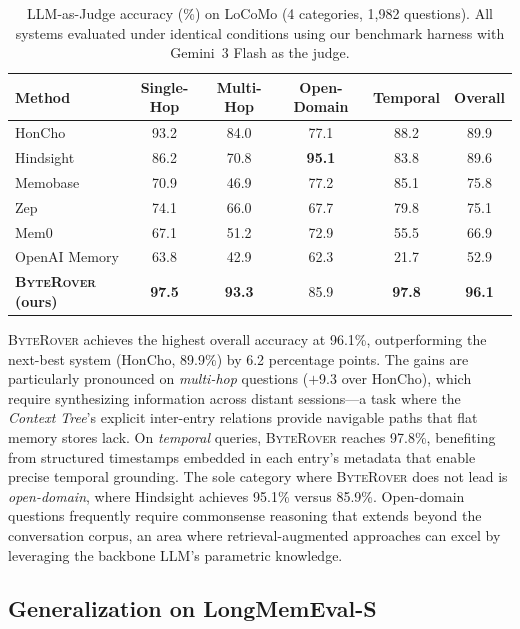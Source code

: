 \documentclass[11pt]{article}
\newcommand{\byterover}{\textsc{ByteRover}}
\newcommand{\contexttree}{\textit{Context Tree}}
\begin{document}
\begin{table}[t]
\centering
\small
\begin{tabular}{@{}lcccc|c@{}}
\toprule
\textbf{Method} & \textbf{Single-Hop} & \textbf{Multi-Hop} & \textbf{Open-Domain} & \textbf{Temporal} & \textbf{Overall} \\
\midrule
HonCho          & 93.2 & 84.0 & 77.1 & 88.2 & 89.9 \\
Hindsight       & 86.2 & 70.8 & \textbf{95.1} & 83.8 & 89.6 \\
Memobase        & 70.9 & 46.9 & 77.2 & 85.1 & 75.8 \\
Zep             & 74.1 & 66.0 & 67.7 & 79.8 & 75.1 \\
Mem0            & 67.1 & 51.2 & 72.9 & 55.5 & 66.9 \\
OpenAI Memory   & 63.8 & 42.9 & 62.3 & 21.7 & 52.9 \\
\midrule
\textbf{\byterover{} (ours)} & \textbf{97.5} & \textbf{93.3} & 85.9 & \textbf{97.8} & \textbf{96.1} \\
\bottomrule
\end{tabular}
\caption{LLM-as-Judge accuracy (\%) on LoCoMo (4 categories, 1{,}982 questions).
  All systems evaluated under identical conditions using our benchmark harness
  with Gemini~3 Flash as the judge.}
\label{tab:locomo}
\end{table}

\byterover{} achieves the highest overall accuracy at 96.1\%,
outperforming the next-best system (HonCho, 89.9\%) by 6.2 percentage points.
The gains are particularly pronounced on \emph{multi-hop} questions
($+$9.3 over HonCho),
which require synthesizing information across distant sessions---a
task where the \contexttree{}'s explicit inter-entry relations
provide navigable paths that flat memory stores lack.
On \emph{temporal} queries, \byterover{} reaches 97.8\%,
benefiting from structured timestamps embedded in each entry's metadata
that enable precise temporal grounding.
The sole category where \byterover{} does not lead is \emph{open-domain},
where Hindsight achieves 95.1\% versus 85.9\%.
Open-domain questions frequently require commonsense reasoning
that extends beyond the conversation corpus,
an area where retrieval-augmented approaches can excel
by leveraging the backbone LLM's parametric knowledge.


\subsection{Generalization on LongMemEval-S}
\label{sec:longmemeval-results}
\end{document}
